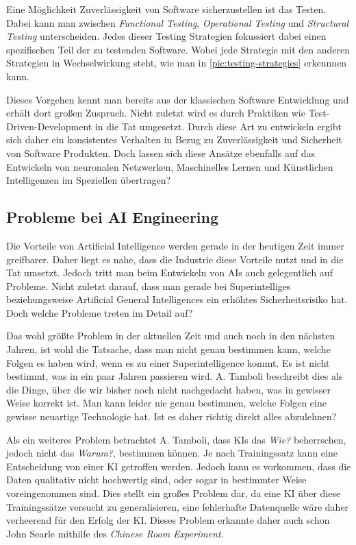         Eine Möglichkeit Zuverlässigkeit von Software sicherzustellen ist das Testen. Dabei kann man zwischen
        \textit{Functional Testing}, \textit{Operational Testing} und \textit{Structural Testing} unterscheiden.
        Jedes dieser Testing Strategien fokussiert dabei einen spezifischen Teil der zu testenden Software. \cite[s. 26]{bertolino2019}
        Wobei jede Strategie mit den anderen Strategien in Wechselwirkung steht, wie man in \ref{pic:testing-strategies}
        erkennnen kann.

        Dieses Vorgehen kennt man bereits aus der klassischen Software Entwicklung und erhält dort großen Zuspruch.
        Nicht zuletzt wird es durch Praktiken wie Test-Driven-Development in die Tat umgesetzt. \cite[s. 403]{Kollanus2010}
        Durch diese Art zu entwickeln ergibt sich daher ein konsistentes Verhalten in Bezug zu Zuverlässigkeit und
        Sicherheit von Software Produkten. Doch lassen sich diese Ansätze ebenfalls auf das Entwickeln von
        neuronalen Netzwerken, Maschinelles Lernen und Künstlichen Intelligenzen im Speziellen übertragen?

        \subsection{Probleme bei AI Engineering}
        Die Vorteile von Artificial Intelligence werden gerade in der heutigen Zeit immer greifbarer. Daher liegt es
        nahe, dass die Industrie diese Vorteile nutzt und in die Tat umsetzt. Jedoch tritt man beim Entwickeln von AIs
        auch gelegentlich auf Probleme. Nicht zuletzt darauf, dass man gerade bei Superintelliges beziehungsweise
        Artificial General Intelligences ein erhöhtes Sicherheitsrisiko hat. Doch welche Probleme treten im Detail auf?

        Das wohl größte Problem in der aktuellen Zeit und auch noch in den nächsten Jahren, ist wohl die Tatsache, dass
        man nicht genau bestimmen kann, welche Folgen es haben wird, wenn es zu einer Superintelligence kommt.
        \cite[s. 21]{Tamboli2019} Es ist nicht bestimmt, was in ein paar Jahren passieren wird. A. Tamboli beschreibt
        dies als die Dinge, über die wir bisher noch nicht nachgedacht haben, was in gewisser Weise korrekt ist.
        Man kann leider nie genau bestimmen, welche Folgen eine gewisse neuartige Technologie hat. Ist es daher richtig
        direkt alles abzulehnen?

        Als ein weiteres Problem betrachtet A. Tamboli, dass KIs das \textit{Wie?} beherrschen, jedoch nicht das
        \textit{Warum?}, bestimmen können.\cite[s. 24]{Tamboli2019} Je nach Trainingssatz kann eine Entscheidung von
        einer KI getroffen werden. Jedoch kann es vorkommen, dass die Daten qualitativ nicht hochwertig sind, oder sogar
        in bestimmter Weise voreingenommen sind. Dies stellt ein großes Problem dar, da eine KI über diese Trainingssätze
        versucht zu generalisieren, eine fehlerhafte Datenquelle wäre daher verheerend für den Erfolg der KI. Dieses
        Problem erkannte daher auch schon John Searle mithilfe des \textit{Chinese Room Experiment}.\cite{cole_2014}

